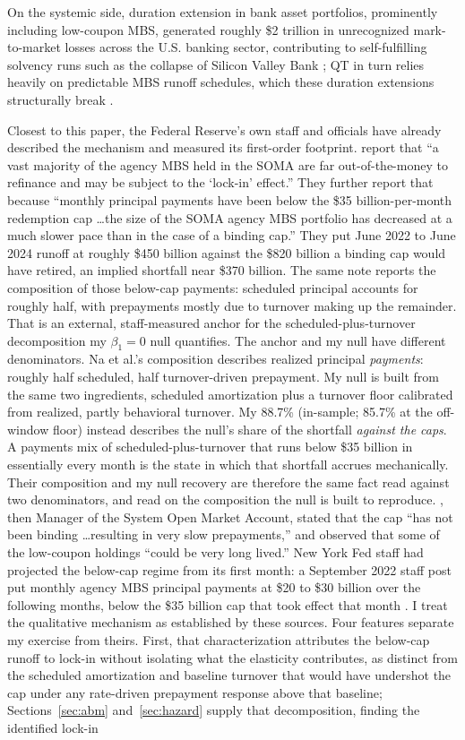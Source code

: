 On the systemic side, duration extension in bank asset portfolios, prominently including low-coupon MBS, generated roughly \$2 trillion in unrecognized mark-to-market losses across the U.S. banking sector, contributing to self-fulfilling solvency runs such as the collapse of Silicon Valley Bank \citep{jiang2023}; QT in turn relies heavily on predictable MBS runoff schedules, which these duration extensions structurally break \citep{smith2023}.

Closest to this paper, the Federal Reserve's own staff and officials have already described the mechanism and measured its first-order footprint. \citet{na2024} report that ``a vast majority of the agency MBS held in the SOMA are far out-of-the-money to refinance and may be subject to the `lock-in' effect.'' They further report that because ``monthly principal payments have been below the \$35 billion-per-month redemption cap \ldots the size of the SOMA agency MBS portfolio has decreased at a much slower pace than in the case of a binding cap.'' They put June 2022 to June 2024 runoff at roughly \$450 billion against the \$820 billion a binding cap would have retired, an implied shortfall near \$370 billion. The same note reports the composition of those below-cap payments: scheduled principal accounts for roughly half, with prepayments mostly due to turnover making up the remainder. That is an external, staff-measured anchor for the scheduled-plus-turnover decomposition my $\beta_1 = 0$ null quantifies. The anchor and my null have different denominators. Na et al.'s composition describes realized principal \emph{payments}: roughly half scheduled, half turnover-driven prepayment. My null is built from the same two ingredients, scheduled amortization plus a turnover floor calibrated from realized, partly behavioral turnover. My 88.7\% (in-sample; 85.7\% at the off-window floor) instead describes the null's share of the shortfall \emph{against the caps}. A payments mix of scheduled-plus-turnover that runs below \$35 billion in essentially every month is the state in which that shortfall accrues mechanically. Their composition and my null recovery are therefore the same fact read against two denominators, and read on the composition the null is built to reproduce. \citet{perli2024}, then Manager of the System Open Market Account, stated that the cap ``has not been binding \ldots resulting in very slow prepayments,'' and \citet{hammack2025} observed that some of the low-coupon holdings ``could be very long lived.'' New York Fed staff had projected the below-cap regime from its first month: a September 2022 staff post put monthly agency MBS principal payments at \$20 to \$30 billion over the following months, below the \$35 billion cap that took effect that month \citep{nyfed2022}. I treat the qualitative mechanism as established by these sources. Four features separate my exercise from theirs. First, that characterization attributes the below-cap runoff to lock-in without isolating what the elasticity contributes, as distinct from the scheduled amortization and baseline turnover that would have undershot the cap under any rate-driven prepayment response above that baseline; Sections~\ref{sec:abm} and~\ref{sec:hazard} supply that decomposition, finding the identified lock-in 